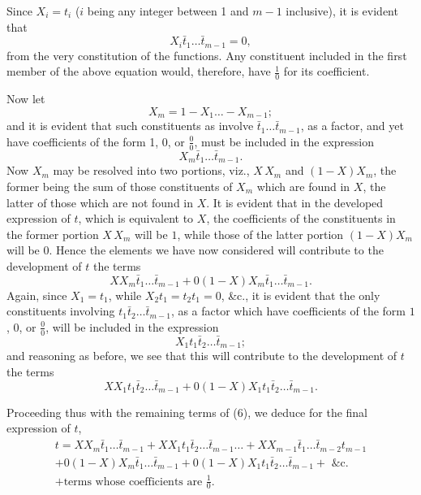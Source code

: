 \documentclass[oneside]{book}
\begin{document}
Since $X_i = t_i$ ($i$ being any integer between 1 and $m-1$
inclusive), it is evident that
\begin{equation*}
X_i \bar{t}_1 \dotsc \bar{t}_{m-1}=0,
\end{equation*}
from the very constitution of the functions. Any constituent
included in the first member of the above equation would, therefore,
have $\displaystyle \frac{1}{0}$ for its coefficient.

Now let
\begin{equation}\tag{7}
X_m = 1 - X_1 \dotsc - X_{m-1};
\end{equation}
and it is evident that such constituents as involve $\bar{t}_1 \dotsc \bar{t}_{m-1}$, as
a factor, and yet have coefficients of the form 1, 0, or $\displaystyle \frac{0}{0}$, must be
included in the expression
\[
  X_m \bar{t}_1 \dotsc \bar{t}_{m-1}.
\]
Now $X_m$ may be resolved into two portions, viz., $X\,X_m$ and
$(1-X)X_m$, the former being the sum of those constituents of
$X_m$ which are found in $X$, the latter of those which are not found
in $X$. It is evident that in the developed expression of $t$, which
is equivalent to $X$, the coefficients of the constituents in the
former portion $X\,X_m$ will be $1$, while those of the latter portion
$(1-X)X_m$ will be $0$. Hence the elements we have now considered will contribute to the development of $t$ the terms
\[
  X X_m     \bar{t}_1 \dotsc \bar{t}_{m-1}
+ 0(1-X)X_m \bar{t}_1 \dotsc \bar{t}_{m-1} .
\]
Again, since $X_1 = t_1$, while $X_2 t_1 = t_2 t_1 = 0$, \&c., it is evident
that the only constituents involving
$t_1 \bar{t}_2 \dotsc \bar{t}_{m-1}$, as a factor which
have coefficients of the form $1$, $0$, or $\frac{0}{0}$, will be included in the expression
\[
  X_1 t_1 \bar{t}_2 \dotsc \bar{t}_{m-1};
\]
and reasoning as before, we see that this will contribute to the development of $t$ the terms
\[
  X X_1 t_1 \bar{t}_2 \dotsc \bar{t}_{m-1}
  + 0(1-X)X_1 t_1 \bar{t}_2 \dotsc \bar{t}_{m-1} .
\]

Proceeding thus with the remaining terms of (6), we deduce
for the final expression of $t$,
\begin{gather*}
  t = X X_m \bar{t}_1 \dotsc \bar{t}_{m-1}
    + X X_1 t_1 \bar{t}_2 \dotsc \bar{t}_{m-1} \dotsc
    + X X_{m-1} \bar{t}_1 \dotsc \bar{t}_{m-2} t_{m-1}
\\
  + 0(1-X)X_m \bar{t}_1 \dotsc \bar{t}_{m-1}
    + 0(1-X)X_1 t_1 \bar{t}_2 \dotsc \bar{t}_{m-1}  + \text{ \&c.}   \tag{8}
\\
  + \text{terms whose coefficients are }\frac{1}{0}.
\end{gather*}
\end{document}
